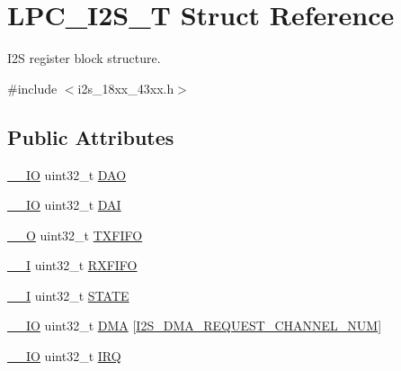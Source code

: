 \hypertarget{struct_l_p_c___i2_s___t}{}\section{L\+P\+C\+\_\+\+I2\+S\+\_\+T Struct Reference}
\label{struct_l_p_c___i2_s___t}


I2S register block structure.  




{\ttfamily \#include $<$i2s\+\_\+18xx\+\_\+43xx.\+h$>$}

\subsection*{Public Attributes}
\begin{DoxyCompactItemize}
\item 
\hyperlink{core__sc300_8h_aec43007d9998a0a0e01faede4133d6be}{\+\_\+\+\_\+\+IO} uint32\+\_\+t \hyperlink{struct_l_p_c___i2_s___t_ad574a0e2f1cdec634e05ee8176c0450e}{D\+AO}
\item 
\hyperlink{core__sc300_8h_aec43007d9998a0a0e01faede4133d6be}{\+\_\+\+\_\+\+IO} uint32\+\_\+t \hyperlink{struct_l_p_c___i2_s___t_ab94e2f49e7d70f8b19c3d74f2e67878e}{D\+AI}
\item 
\hyperlink{core__sc300_8h_a7e25d9380f9ef903923964322e71f2f6}{\+\_\+\+\_\+O} uint32\+\_\+t \hyperlink{struct_l_p_c___i2_s___t_aa3a381d218c4342917885fa3a51e82d8}{T\+X\+F\+I\+FO}
\item 
\hyperlink{core__sc300_8h_af63697ed9952cc71e1225efe205f6cd3}{\+\_\+\+\_\+I} uint32\+\_\+t \hyperlink{struct_l_p_c___i2_s___t_aac5c44248c1354eb4320eb5fa5b18baa}{R\+X\+F\+I\+FO}
\item 
\hyperlink{core__sc300_8h_af63697ed9952cc71e1225efe205f6cd3}{\+\_\+\+\_\+I} uint32\+\_\+t \hyperlink{struct_l_p_c___i2_s___t_a35299409c86d4860e936a7ff3e5603bf}{S\+T\+A\+TE}
\item 
\hyperlink{core__sc300_8h_aec43007d9998a0a0e01faede4133d6be}{\+\_\+\+\_\+\+IO} uint32\+\_\+t \hyperlink{struct_l_p_c___i2_s___t_a2259283a5ad23aa09617861948df25d7}{D\+MA} \mbox{[}\hyperlink{group___i2_s__18_x_x__43_x_x_ggac04c1583101ddd661886d9677683421bab9921186ab93fee889b2074d508b88ce}{I2\+S\+\_\+\+D\+M\+A\+\_\+\+R\+E\+Q\+U\+E\+S\+T\+\_\+\+C\+H\+A\+N\+N\+E\+L\+\_\+\+N\+UM}\mbox{]}
\item 
\hyperlink{core__sc300_8h_aec43007d9998a0a0e01faede4133d6be}{\+\_\+\+\_\+\+IO} uint32\+\_\+t \hyperlink{struct_l_p_c___i2_s___t_a0ed73323cb1c577293f1416c6c55c47f}{I\+RQ}

\end{DoxyCompactItemize}
